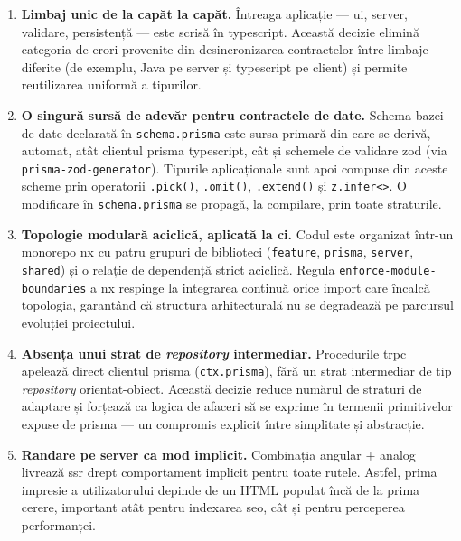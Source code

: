 \begin{enumerate}
  \item \textbf{Limbaj unic de la capăt la capăt.} Întreaga aplicație --- \acrshort{ui}, server, validare, persistență --- este scrisă în \gls{typescript}. Această decizie elimină categoria de erori provenite din desincronizarea contractelor între limbaje diferite (de exemplu, Java pe server și \gls{typescript} pe client) și permite reutilizarea uniformă a tipurilor.

  \item \textbf{O singură sursă de adevăr pentru contractele de date.} Schema bazei de date declarată în \texttt{schema.prisma} este sursa primară din care se derivă, automat, atât clientul \gls{prisma} \gls{typescript}, cât și schemele de validare \gls{zod} (via \texttt{prisma-zod-generator}). Tipurile aplicaționale sunt apoi compuse din aceste scheme prin operatorii \texttt{.pick()}, \texttt{.omit()}, \texttt{.extend()} și \texttt{z.infer<>}. O modificare în \texttt{schema.prisma} se propagă, la compilare, prin toate straturile.

  \item \textbf{Topologie modulară aciclică, aplicată la \acrshort{ci}.} Codul este organizat într-un \gls{monorepo} \gls{nx} cu patru grupuri de biblioteci (\texttt{feature}, \texttt{prisma}, \texttt{server}, \texttt{shared}) și o relație de dependență strict aciclică. Regula \texttt{enforce-module-boundaries} a \gls{nx} respinge la integrarea continuă orice import care încalcă topologia, garantând că structura arhitecturală nu se degradează pe parcursul evoluției proiectului.

  \item \textbf{Absența unui strat de \textit{repository} intermediar.} Procedurile \gls{trpc} apelează direct clientul \gls{prisma} (\texttt{ctx.prisma}), fără un strat intermediar de tip \textit{repository} orientat-obiect. Această decizie reduce numărul de straturi de adaptare și forțează ca logica de afaceri să se exprime în termenii primitivelor expuse de \gls{prisma} --- un compromis explicit între simplitate și abstracție.

  \item \textbf{Randare pe server ca mod implicit.} Combinația \gls{angular} \(+\) \gls{analog} livrează \acrshort{ssr} drept comportament implicit pentru toate rutele. Astfel, prima impresie a utilizatorului depinde de un HTML populat încă de la prima cerere, important atât pentru indexarea \acrshort{seo}, cât și pentru perceperea performanței.
\end{enumerate}

